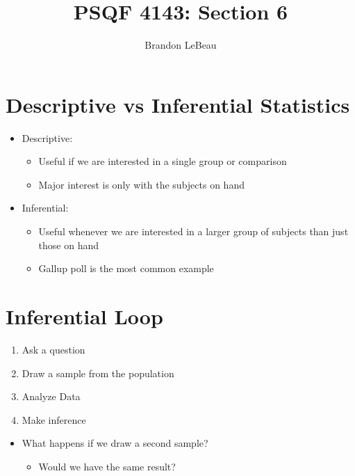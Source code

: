 \documentclass[12pt]{article}
\title{PSQF 4143: Section 6}
\author{Brandon LeBeau}
\date{}
\begin{document}
\maketitle

\section{Descriptive vs Inferential
Statistics}\label{descriptive-vs-inferential-statistics}

\begin{itemize}
\itemsep1pt\parskip0pt
\item
  Descriptive:

  \begin{itemize}
  \itemsep1pt\parskip0pt
  \item
    Useful if we are interested in a single group or comparison
  \item
    Major interest is only with the subjects on hand
  \end{itemize}
\item
  Inferential:

  \begin{itemize}
  \itemsep1pt\parskip0pt
  \item
    Useful whenever we are interested in a larger group of subjects than
    just those on hand
  \item
    Gallup poll is the most common example
  \end{itemize}
\end{itemize}

\section{Inferential Loop}\label{inferential-loop}

\begin{enumerate}
\def\labelenumi{\arabic{enumi}.}
\itemsep1pt\parskip0pt
\item
  Ask a question
\item
  Draw a sample from the population
\item
  Analyze Data
\item
  Make inference
\end{enumerate}

\begin{itemize}
\itemsep1pt\parskip0pt
\item
  What happens if we draw a second sample?

  \begin{itemize}
  \itemsep1pt\parskip0pt
  \item
    Would we have the same result?
  \end{itemize}
\end{itemize}
\end{document}

